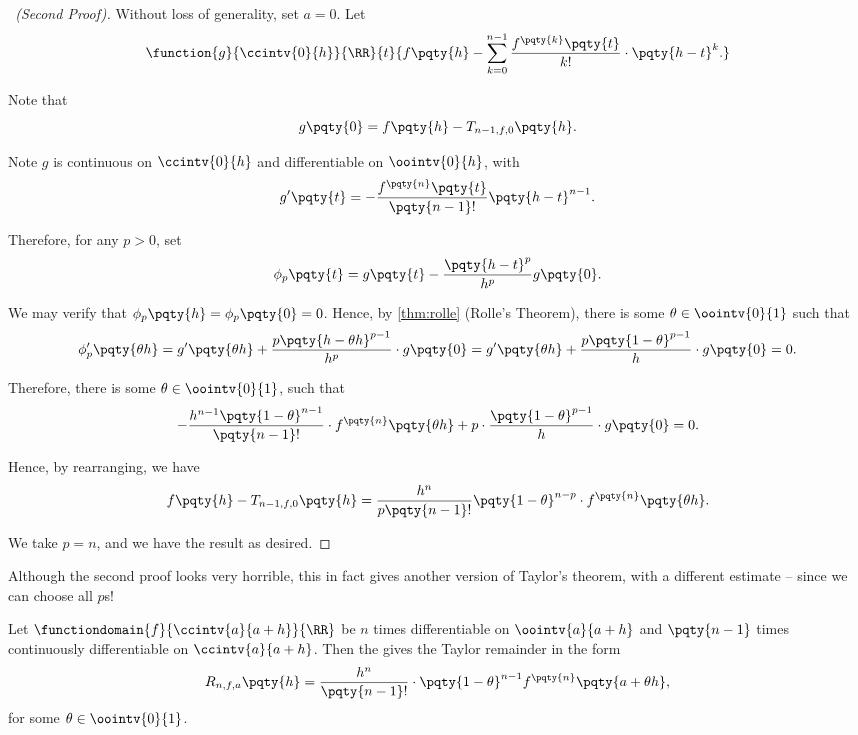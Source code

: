 \begin{proof}[\proofname\ (Second Proof)]
    Without loss of generality, set \(a = 0\). Let
    \[
        \function{g}{\ccintv{0}{h}}{\RR}{t}{f\pqty{h} - \sum_{k = 0}^{n - 1} \frac{f^{\pqty{k}} \pqty{t}}{k!} \cdot \pqty{h - t}^{k}.}
    \]

    Note that
    \[
        g\pqty{0} = f\pqty{h} - T_{n - 1, f, 0} \pqty{h}.
    \]  

    Note \(g\) is continuous on \(\ccintv{0}{h}\) and differentiable on \(\oointv{0}{h}\), with
    \[
        g'\pqty{t} = - \frac{f^{\pqty{n}}\pqty{t}}{\pqty{n - 1}!} \pqty{h - t}^{n - 1}.
    \]

    Therefore, for any \(p > 0\), set
    \[
        \phi_{p} \pqty{t} = g\pqty{t} - \frac{\pqty{h - t}^{p}}{h^p} g\pqty{0}.
    \]

    We may verify that \(\phi_{p} \pqty{h} = \phi_p \pqty{0} = 0\). Hence, by \autoref{thm:rolle} (Rolle's Theorem), there is some \(\theta \in \oointv{0}{1}\) such that
    \[
        \phi_p' \pqty{\theta h} = g' \pqty{\theta h} + \frac{p \pqty{h - \theta h}^{p - 1}}{h^p} \cdot g\pqty{0} = g'\pqty{\theta h} + \frac{p \pqty{1 - \theta}^{p - 1}}{h} \cdot g\pqty{0} = 0.
    \]

    Therefore, there is some \(\theta \in \oointv{0}{1}\), such that
    \[
        - \frac{h^{n - 1} \pqty{1 - \theta}^{n - 1}}{\pqty{n - 1}!} \cdot f^{\pqty{n}} \pqty{\theta h} + p \cdot \frac{\pqty{1 - \theta}^{p - 1}}{h} \cdot g\pqty{0} = 0.
    \]

    Hence, by rearranging, we have
    \[
        f\pqty{h} - T_{n - 1, f, 0} \pqty{h} = \frac{h^n}{p \pqty{n - 1}!} \pqty{1 - \theta}^{n - p} \cdot f^{\pqty{n}} \pqty{\theta h}.
    \]

    We take \(p = n\), and we have the result as desired.
\end{proof}

Although the second proof looks very horrible, this in fact gives another version of Taylor's theorem, with a different estimate -- since we can choose all \(p\)s!

\begin{theorem}
    \label{thm:taylor-thm-cauchy-remainder}%
    Let \(\functiondomain{f}{\ccintv{a}{a + h}}{\RR}\) be \(n\) times differentiable on \(\oointv{a}{a + h}\) and \(\pqty{n - 1}\) times continuously differentiable on \(\ccintv{a}{a + h}\). Then the  gives the Taylor remainder in the form
    \[
        R_{n, f, a} \pqty{h} = \frac{h^{n}}{\pqty{n - 1}!} \cdot \pqty{1 - \theta}^{n - 1} f^{\pqty{n}} \pqty{a + \theta h},
    \]
    for some \(\theta \in \oointv{0}{1}\).
\end{theorem}

